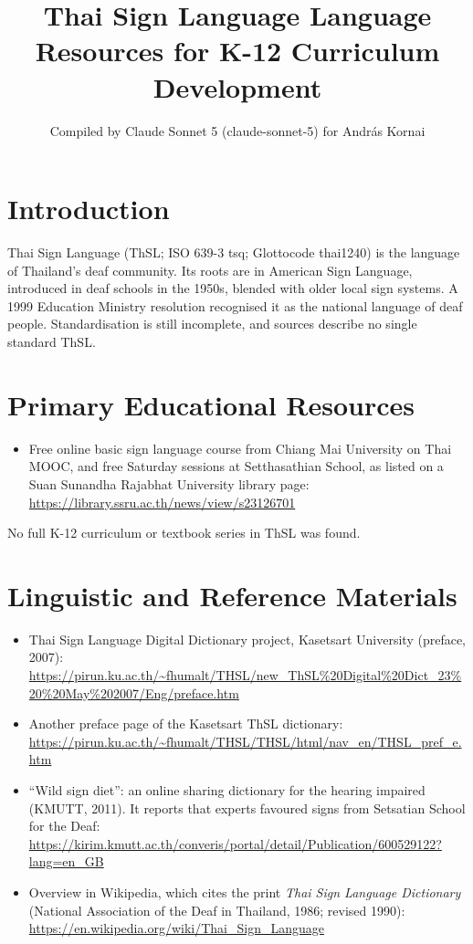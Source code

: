 \documentclass[12pt]{article}
\title{Thai Sign Language Language Resources for K-12 Curriculum Development}
\author{Compiled by Claude Sonnet 5 (claude-sonnet-5) for Andr\'as Kornai}
\date{}
\begin{document}
\maketitle

\section{Introduction}
Thai Sign Language (ThSL; ISO 639-3 tsq; Glottocode thai1240) is the language of Thailand's deaf community. Its roots are in American Sign Language, introduced in deaf schools in the 1950s, blended with older local sign systems. A 1999 Education Ministry resolution recognised it as the national language of deaf people. Standardisation is still incomplete, and sources describe no single standard ThSL.

\section{Primary Educational Resources}
\begin{itemize}
\item Free online basic sign language course from Chiang Mai University on Thai MOOC, and free Saturday sessions at Setthasathian School, as listed on a Suan Sunandha Rajabhat University library page: \url{https://library.ssru.ac.th/news/view/s23126701}
\end{itemize}
No full K-12 curriculum or textbook series in ThSL was found.

\section{Linguistic and Reference Materials}
\begin{itemize}
\item Thai Sign Language Digital Dictionary project, Kasetsart University (preface, 2007): \url{https://pirun.ku.ac.th/~fhumalt/THSL/new_ThSL%20Digital%20Dict_23%20%20May%202007/Eng/preface.htm}
\item Another preface page of the Kasetsart ThSL dictionary: \url{https://pirun.ku.ac.th/~fhumalt/THSL/THSL/html/nav_en/THSL_pref_e.htm}
\item ``Wild sign diet'': an online sharing dictionary for the hearing impaired (KMUTT, 2011). It reports that experts favoured signs from Setsatian School for the Deaf: \url{https://kirim.kmutt.ac.th/converis/portal/detail/Publication/600529122?lang=en_GB}
\item Overview in Wikipedia, which cites the print \textit{Thai Sign Language Dictionary} (National Association of the Deaf in Thailand, 1986; revised 1990): \url{https://en.wikipedia.org/wiki/Thai_Sign_Language}
\end{itemize}
\end{document}
